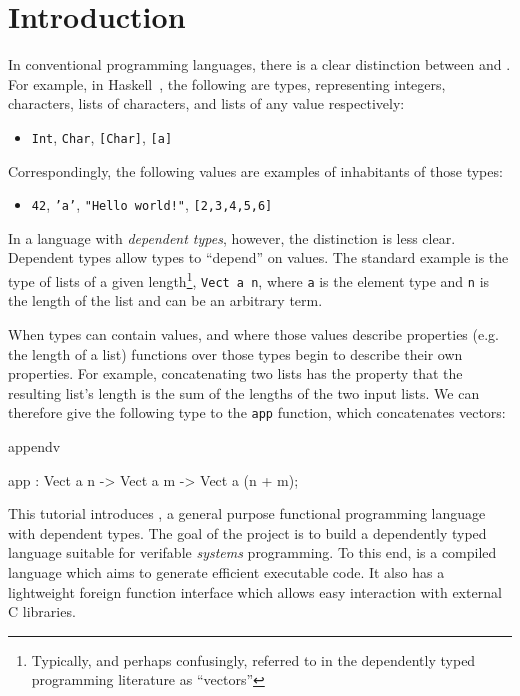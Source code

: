 \section{Introduction}

In conventional programming languages, there is a clear distinction between
 and . For example, in Haskell~\cite{haskell-report},
the following are types, representing integers, characters, lists of characters,
and lists of any value respectively:

\begin{itemize}
\item \texttt{Int}, \texttt{Char}, \texttt{[Char]}, \texttt{[a]}
\end{itemize}

\noindent
Correspondingly, the following values are examples of inhabitants of those types:

\begin{itemize}
\item \texttt{42}, \texttt{'a'}, \texttt{"Hello world!"}, \texttt{[2,3,4,5,6]}
\end{itemize}

In a language with \emph{dependent types}, however, the distinction is less
clear.  Dependent types allow types to ``depend'' on values. The standard
example is the type of lists of a given length\footnote{Typically, and perhaps
confusingly, referred to in the dependently typed programming literature as
``vectors''}, \texttt{Vect a n}, where \texttt{a} is the element type and
\texttt{n} is the length of the list and can be an arbitrary
term.

When types can contain values, and where those values describe properties (e.g.
the length of a list)
functions over those types begin to describe their own properties. For example,
concatenating two lists has the property that the resulting list's length is
the sum of the lengths of the two input lists. We can therefore give the following type 
to the  \texttt{app} function, which concatenates vectors: 

\begin{SaveVerbatim}{appendv}

app : Vect a n -> Vect a m -> Vect a (n + m);

\end{SaveVerbatim}


This tutorial introduces \Idris{}, a general purpose functional 
programming language with dependent types.
The goal of the \Idris{} project is to build a dependently typed language suitable
for verifable \emph{systems} programming. To this end, \Idris{} is a compiled language
which aims to generate efficient executable code. It also has a lightweight foreign
function interface which allows easy interaction with external C libraries.

